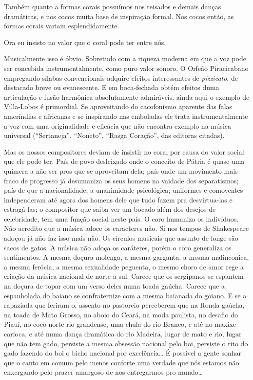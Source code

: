 Também quanto a formas corais possuímos nos reisados e demais danças
dramáticas, e nos cocos muita base de inspiração formal. Nos cocos
então, as formas corais variam esplendidamente.

Ora eu insisto no valor que o coral pode ter entre nós.

Musicalmente isso é óbvio. Sobretudo com a riqueza moderna em que a voz
pode ser concebida instrumentalmente, como puro valor sonoro. O Orfeão
Piracicabano empregando sílabas convencionais adquire efeitos
interessantes de \textit{pizzicato}, de destacado breve ou evanescente. E em
boca-fechada obtém efeitos duma articulação e fusão harmônica
absolutamente admiráveis. ainda aqui o exemplo de Villa-Lobos é
primordial. Se aproveitando do cacofonismo aparente das falas ameríndias
e africanas e se inspirando nas emboladas ele trata instrumentalmente a
voz com uma originalidade e eficácia que não encontra exemplo na música
universal (``Sertaneja'', ``Noneto'', ``Rasga Coração'', das editoras citadas).

Mas os nossos compositores deviam de insistir no coral por causa do
valor social que ele pode ter. País de povo desleixado onde o conceito
de Pátria é quase uma quimera a não ser pros que se aproveitam dela;
país onde um movimento mais fraco de progresso já desumaniza os seus
homens na vaidade dos separatismos; país de que a nacionalidade, a
unanimidade psicológica; uniformes e comoventes independeram até agora
dos homens dele que tudo fazem pra desvirtua-las e estragá-las; o
compositor que saiba ver um bocado além dos desejos de celebridade, tem
uma função social neste país. O coro humaniza os indivíduos. Não
acredito que a música adoce os caracteres não. Si nos tempos de
Shakespeare adoçou já não faz isso mais não. Os círculos musicais que
assunto de longe são sacos de gatos. A música não adoça os caráteres,
porém o coro generaliza os sentimentos. A mesma doçura molenga, a mesma
garganta, a mesma malinconica, a mesma ferócia, a mesma sexualidade
peguenta, o mesmo choro de amor rege a criação da música nacional de
norte a sul. Carece que os sergipanos se espantem na doçura de topar com
um verso deles numa toada gaúcha. Carece que a espanholada do baiano se
confraternize com a mesma baianada do goiano. E se a rapaziada que
feriram o, assento no pastoreio perceberem que na Ronda gaúcha, na toada
de Mato Grosso, no aboio do Ceará, na moda paulista, no desafio do
Piauí, no coco norte-rio-grandense, uma chula do rio Branco, e até no
maxixe carioca, e até numa dança dramática do rio Madeira, lugar de mato
e rio, lugar que não tem gado, persiste a mesma obsessão nacional pelo
boi, persiste o rito do gado fazendo do boi o bicho nacional por
excelência\ldots{} É possível a gente sonhar que o canto em comum pelo menos
conforte uma verdade que nós estamos não enxergando pelo prazer amargoso
de nos entregarmos pro mundo\ldots{}

